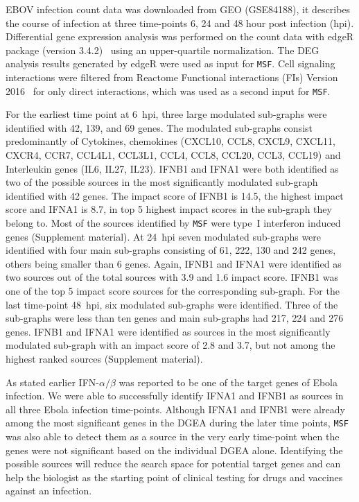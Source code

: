 \documentclass[10pt,a4paper,twocolumn]{article}
\begin{document}
	EBOV infection count data was downloaded from GEO (GSE84188),
        it describes the course of infection at three time-points 6,
        24 and 48 hour post infection (hpi). Differential gene
        expression analysis was performed on the count data with edgeR
        package (version 3.4.2)~\cite{edgeR} using an upper-quartile
        normalization. The DEG analysis results generated by edgeR
        were used as input for \texttt{MSF}. Cell signaling
        interactions were filtered from Reactome Functional
        interactions (FIs) Version 2016~\cite{Cytokegg} for only
        direct interactions, which was used as a second input for
        \texttt{MSF}.
	
	For the earliest time point at 6~hpi, three large modulated
        sub-graphs were identified with 42, 139, and 69 genes.  The
        modulated sub-graphs consist predominantly of Cytokines,
        chemokines (CXCL10, CCL8, CXCL9, CXCL11, CXCR4, CCR7, CCL4L1,
        CCL3L1, CCL4, CCL8, CCL20, CCL3, CCL19) and Interleukin genes
        (IL6, IL27, IL23).  IFNB1 and IFNA1 were both identified as
        two of the possible sources in the most significantly
        modulated sub-graph identified with 42 genes. The impact score
        of IFNB1 is 14.5, the highest impact score and IFNA1 is 8.7, in top 5 highest impact scores in the sub-graph they belong to. Most of the sources identified by \texttt{MSF}
        were type~I interferon induced genes (Supplement material).
        At 24~hpi seven modulated sub-graphs were identified with four
        main sub-graphs consisting of 61, 222, 130 and 242 genes,
        others being smaller than 6 genes. Again, IFNB1 and IFNA1 were
        identified as two sources out of the total sources with 3.9 
        and 1.6 impact score. IFNB1 was one of the top 5 impact score sources for the corresponding sub-graph. For the last time-point 48~hpi, six
        modulated sub-graphs were identified. Three of the sub-graphs
        were less than ten genes and main sub-graphs had 217, 224 and
        276 genes. IFNB1 and IFNA1 were identified as sources in the
        most significantly modulated sub-graph with an impact score of
        2.8 and 3.7, but not among the highest ranked sources (Supplement material). 
	
	As stated earlier IFN-$\alpha / \beta$ was reported to be one
        of the target genes of Ebola infection. We were able to
        successfully identify IFNA1 and IFNB1 as sources in all three
        Ebola infection time-points. Although IFNA1 and IFNB1 were
        already among the most significant genes in the DGEA during
        the later time points, \texttt{MSF} was also able to detect
        them as a source in the very early time-point when the genes
        were not significant based on the individual DGEA
        alone. Identifying the possible sources will reduce the search
        space for potential target genes and can help the biologist as
        the starting point of clinical testing for drugs and vaccines
        against an infection.
	
\end{document}
